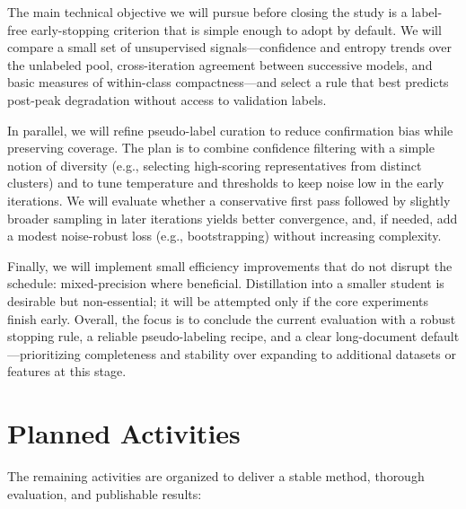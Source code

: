 \documentclass[]{politex-xico}
\begin{document}
The main technical objective we will pursue before closing the study is a label-free early-stopping criterion that is simple enough to adopt by default. We will compare a small set of unsupervised signals—confidence and entropy trends over the unlabeled pool, cross-iteration agreement between successive models, and basic measures of within-class compactness—and select a rule that best predicts post-peak degradation without access to validation labels. 

In parallel, we will refine pseudo-label curation to reduce confirmation bias while preserving coverage. The plan is to combine confidence filtering with a simple notion of diversity (e.g., selecting high-scoring representatives from distinct clusters) and to tune temperature and thresholds to keep noise low in the early iterations. We will evaluate whether a conservative first pass followed by slightly broader sampling in later iterations yields better convergence, and, if needed, add a modest noise-robust loss (e.g., bootstrapping) without increasing complexity.

Finally, we will implement small efficiency improvements that do not disrupt the schedule: mixed-precision where beneficial. Distillation into a smaller student is desirable but non-essential; it will be attempted only if the core experiments finish early. Overall, the focus is to conclude the current evaluation with a robust stopping rule, a reliable pseudo-labeling recipe, and a clear long-document default—prioritizing completeness and stability over expanding to additional datasets or features at this stage.

\section{Planned Activities}
\label{sec:activities}

The remaining activities are organized to deliver a stable method, thorough evaluation, and publishable results:
\end{document}
